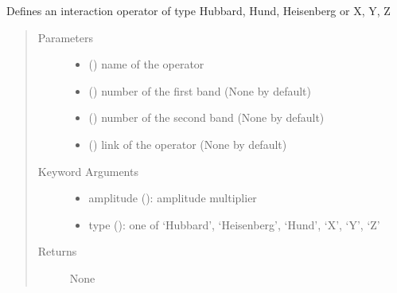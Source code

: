 \documentclass[letterpaper,10pt,english]{sphinxmanual}
\begin{document}
\begin{fulllineitems}
\label{\detokenize{functions:pyqcm.interaction_operator}}
\sphinxAtStartPar
Defines an interaction operator of type Hubbard, Hund, Heisenberg or X, Y, Z
\begin{quote}\begin{description}
\item[{Parameters}] \leavevmode\begin{itemize}
\item {} 
\sphinxAtStartPar
{} () \textendash{} name of the operator

\item {} 
\sphinxAtStartPar
{} () \textendash{} number of the first band (None by default)

\item {} 
\sphinxAtStartPar
{} () \textendash{} number of the second band (None by default)

\item {} 
\sphinxAtStartPar
{} () \textendash{} link of the operator (None by default)

\end{itemize}

\item[{Keyword Arguments}] \leavevmode\begin{itemize}
\item {} 
\sphinxAtStartPar
amplitude (): amplitude multiplier

\item {} 
\sphinxAtStartPar
type (): one of ‘Hubbard’, ‘Heisenberg’, ‘Hund’, ‘X’, ‘Y’, ‘Z’

\end{itemize}

\item[{Returns}] \leavevmode
\sphinxAtStartPar
None

\end{description}\end{quote}

\end{fulllineitems}
\end{document}
